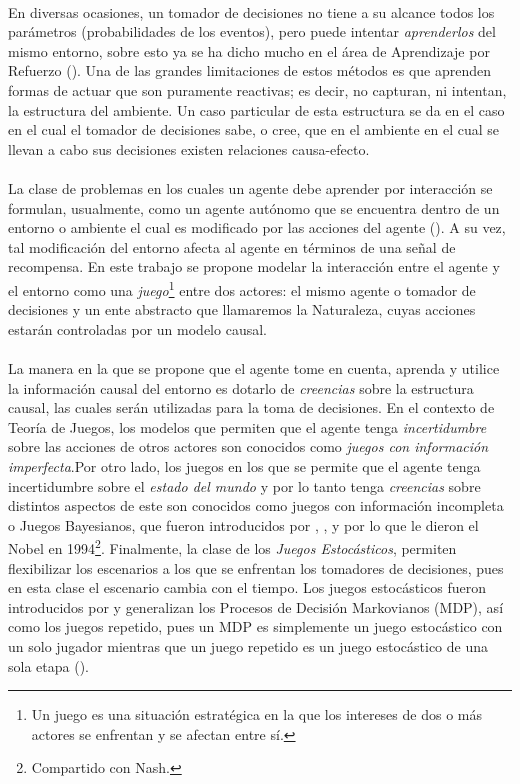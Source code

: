 \documentclass[11pt]{article}
\theoremstyle{plain}
\begin{document}
\\
\indent En diversas ocasiones, un tomador de decisiones no tiene a su alcance todos los parámetros (probabilidades de los eventos), pero puede intentar \textit{aprenderlos} del mismo entorno, sobre esto ya se ha dicho mucho en el área de Aprendizaje por Refuerzo (\cite{sutton1998reinforcement}). Una de las grandes limitaciones de estos métodos es que aprenden formas de actuar que son puramente reactivas; es decir, no capturan, ni intentan, la estructura del ambiente. Un caso particular de esta estructura se da en el caso en el cual el tomador de decisiones sabe, o cree, que en el ambiente en el cual se llevan a cabo sus decisiones existen relaciones causa-efecto.\\
\\
\indent La clase de problemas en los cuales un agente debe aprender por interacción se formulan, usualmente, como un agente autónomo que se encuentra dentro de un entorno o ambiente el cual es modificado por las acciones del agente (\cite{sutton1998reinforcement}). A su vez, tal modificación del entorno afecta al agente en términos de una señal de recompensa. En este trabajo se propone modelar la interacción entre el agente y el entorno como una \textit{juego}\footnote{Un juego es una situación estratégica en la que los intereses de dos o más actores se enfrentan y se afectan entre sí.} entre dos actores: el mismo agente o tomador de decisiones y un ente abstracto que llamaremos la Naturaleza, cuyas acciones estarán controladas por un modelo causal.\\
\\
\indent La manera en la que se propone que el agente tome en cuenta, aprenda y utilice la información causal del entorno es dotarlo de \textit{creencias} sobre la estructura causal, las cuales serán utilizadas para la toma de decisiones. En el contexto de Teoría de Juegos, los modelos que permiten que el agente tenga \textit{incertidumbre} sobre las acciones de otros actores son conocidos como \textit{juegos con información imperfecta}.Por otro lado, los juegos en los que se permite que el agente tenga incertidumbre sobre el \textit{estado del mundo} y por lo tanto tenga \textit{creencias} sobre distintos aspectos de este son conocidos como juegos con información incompleta o Juegos Bayesianos, que fueron introducidos por \cite{harsanyi1967games1}, \cite{harsanyi1968games2}, \cite{harsanyi1968games3} y por lo que le dieron el Nobel en 1994\footnote{Compartido con Nash.}. Finalmente, la clase de los \textit{Juegos Estocásticos}, permiten flexibilizar los escenarios a los que se enfrentan los tomadores de decisiones, pues en esta clase el escenario cambia con el tiempo. Los juegos estocásticos fueron introducidos por \cite{shapley1953stochastic} y generalizan los Procesos de Decisión Markovianos (MDP), así como los juegos repetido, pues un MDP es simplemente un juego estocástico con un solo jugador mientras que un juego repetido es un juego estocástico de una sola etapa (\cite{shoham2008multiagent}).\\
\end{document}
